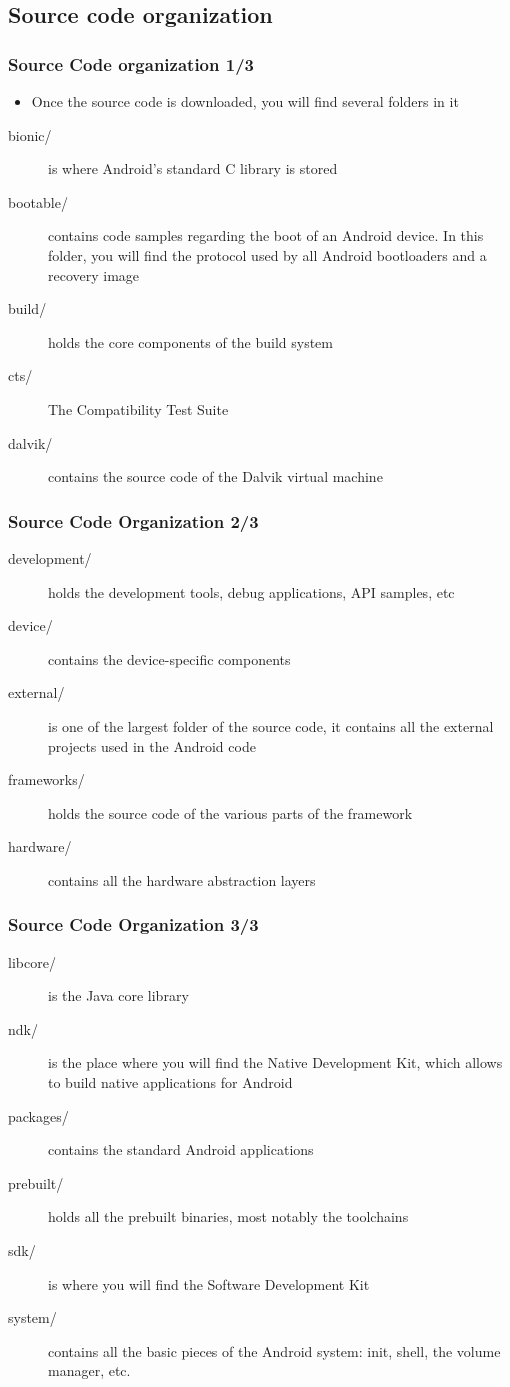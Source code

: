 \subsection{Source code organization}
\begin{frame}
  \frametitle{Source Code organization 1/3}
  \begin{itemize}
  \item Once the source code is downloaded, you will find several
    folders in it
  \end{itemize}
  \begin{description}
  \item[bionic/] is where Android's standard C library is stored
  \item[bootable/] contains code samples regarding the boot of an
    Android device. In this folder, you will find the protocol used by
    all Android bootloaders and a recovery image
  \item[build/] holds the core components of the build system
  \item[cts/] The Compatibility Test Suite
  \item[dalvik/] contains the source code of the Dalvik virtual
    machine
  \end{description}
\end{frame}

\begin{frame}
  \frametitle{Source Code Organization 2/3}
  \begin{description}
  \item[development/] holds the development tools, debug applications,
    API samples, etc
  \item[device/] contains the device-specific components
  \item[external/] is one of the largest folder of the source code, it
    contains all the external projects used in the Android code
  \item[frameworks/] holds the source code of the various parts of the
    framework
  \item[hardware/] contains all the hardware abstraction layers
  \end{description}
\end{frame}

\begin{frame}
  \frametitle{Source Code Organization 3/3}
  \begin{description}
  \item[libcore/] is the Java core library
  \item[ndk/] is the place where you will find the Native Development
    Kit, which allows to build native applications for Android
  \item[packages/] contains the standard Android applications
  \item[prebuilt/] holds all the prebuilt binaries, most notably the
    toolchains
  \item[sdk/] is where you will find the Software Development Kit
  \item[system/] contains all the basic pieces of the Android system:
    init, shell, the volume manager, etc.
  \end{description}
\end{frame}
